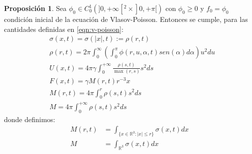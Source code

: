 \documentclass[a4paper,10pt]{scrartcl}
\theoremstyle{definition}
\newtheorem{fact}{Proposición}
\numberwithin{equation}{section}
\begin{document}
\begin{fact}
Sea $\phi_0 \in C_0^1(]0,+\infty[^2 \times ]0,+\pi[)$ con $\phi_0 \ge 0$ y $f_0 = \phi_0$ condición inicial de la ecuación de Vlasov-Poisson. Entonces se cumple, para las cantidades definidas en \eqref{eqn:v-poisson}:
\begin{align*}
 & \sigma(x,t) = \sigma(|x|,t) := \rho(r,t)\\
 & \rho(r, t) = 2\pi \int_0^{\infty} \left(\int_0^\pi \phi(r, u, \alpha, t) sen(\alpha) d\alpha \right)u^2 du\\
 & U(x,t) = 4\pi\gamma \int_0^{+\infty} \frac{\rho(s,t)}{\max(r,s)} s^2 ds\\
 & F(x,t) = \gamma M(r,t) r^{-3} x\\
 & M(r,t) = 4\pi \int_0^r\rho(s,t) s^2 ds\\
 & M = 4\pi \int_0^{+\infty}\rho(s,t) s^2 ds
\end{align*}
donde definimos:
\begin{align*}
 M(r,t) &= \int_{\{x\in \mathbb{R}^3: |x|\le r\}} \sigma(x,t) dx\\
 M &= \int_{\mathbb{R}^3} \sigma(x,t) dx
\end{align*}
\end{fact}
\end{document}
